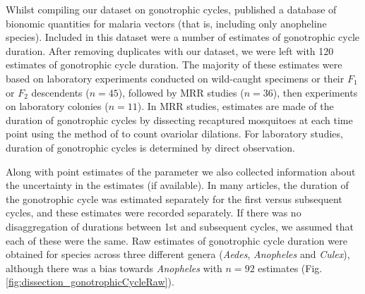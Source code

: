 \documentclass[12pt]{article}
\begin{document}
{Whilst compiling our dataset on gonotrophic cycles, \cite{massey2016global} published a database of bionomic quantities for malaria vectors (that is, including only anopheline species). Included in this dataset were a number of estimates of gonotrophic cycle duration. After removing duplicates with our dataset, we were left with 120 estimates of gonotrophic cycle duration. The majority of these estimates were based on laboratory experiments conducted on wild-caught specimens or their $F_1$ or $F_2$ descendents ($n=45$), followed by MRR studies ($n=36$), then experiments on laboratory colonies ($n=11$). In MRR studies, estimates are made of the duration of gonotrophic cycles by dissecting recaptured mosquitoes at each time point using the method of \cite{polovodova1949determination} to count ovariolar dilations. For laboratory studies, duration of gonotrophic cycles is determined by direct observation.

Along with point estimates of the parameter we also collected information about the uncertainty in the estimates (if available). In many articles, the duration of the gonotrophic cycle was estimated separately for the first versus subsequent cycles, and these estimates were recorded separately. If there was no disaggregation of durations between 1st and subsequent cycles, we assumed that each of these were the same. Raw estimates of gonotrophic cycle duration were obtained for species across three different genera (\textit{Aedes}, \textit{Anopheles} and \textit{Culex}), although there was a bias towards \textit{Anopheles} with $n=92$ estimates (Fig. \ref{fig:dissection_gonotrophicCycleRaw}).

}
\end{document}
